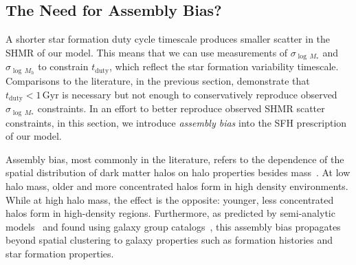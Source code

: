 \documentclass[12pt, letterpaper, preprint, tighten]{aastex}
\begin{document}
\subsection{The Need for Assembly Bias?}
A shorter star formation duty cycle timescale produces smaller scatter in the 
SHMR of our model. This means that we can use measurements of $\sigma_{\log\,M_*}$ 
and $\sigma_{\log\,M_h}$ to constrain $t_\mathrm{duty}$, which reflect the 
star formation variability timescale. Comparisons to the literature, in the 
previous section, demonstrate that $t_\mathrm{duty} < 1\,\mathrm{Gyr}$ is 
necessary but not enough to conservatively reproduce observed $\sigma_{\log\,M_*}$ 
constraints. In an effort to better reproduce observed SHMR scatter constraints, 
in this section, we introduce \emph{assembly bias} into the SFH prescription of 
our model.

Assembly bias, most commonly in the literature, refers to the dependence of the 
spatial distribution of dark matter halos on halo properties besides 
mass~\citep{gao2005,wechsler2006,gao2007,wetzel2007,li2008,sunayama2016}.
At low halo mass, older and more concentrated halos form in high density environments. 
While at high halo mass, the effect is the opposite: younger, less concentrated 
halos form in high-density regions. Furthermore, as predicted by semi-analytic 
models~\citep{croton2007} and found using galaxy group 
catalogs~\citep{yang2006,wang2008,tinker2011,wang2013,lacerna2014,tinker2017,tinker2017b,tinker2018},
this assembly bias propagates beyond spatial clustering to galaxy properties
such as formation histories and star formation properties. 
\end{document}
